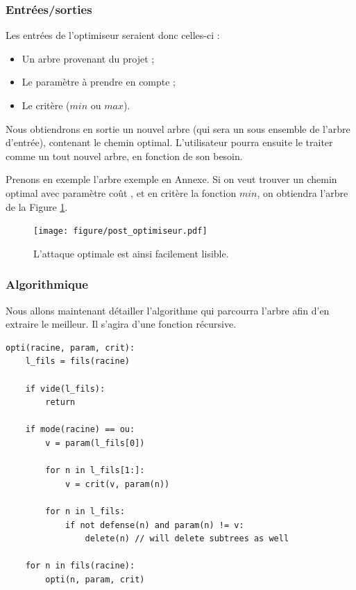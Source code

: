 		\subsubsection{Entrées/sorties}
			Les entrées de l'optimiseur seraient donc celles-ci :
			\begin{itemize}
				\item Un arbre provenant du projet ;
				\item Le paramètre à prendre en compte ;
				\item Le critère ($min$ ou $max$).\newline
			\end{itemize}
			
			Nous obtiendrons en sortie un nouvel arbre (qui sera un sous ensemble de l'arbre d'entrée), contenant le chemin optimal. 
			L'utilisateur pourra ensuite le traiter comme un tout nouvel arbre, en fonction de son besoin.

			Prenons en exemple l'arbre exemple en Annexe. %
			Si on veut trouver un chemin optimal avec paramètre \og coût \fg, et en critère la fonction $min$, on obtiendra l'arbre de la Figure \ref{fig:arbre_post_opti}.

		\begin{figure}[h!]
			\centering
			\texttt{[image: figure/post\_optimiseur.pdf]}
			\caption{L'attaque optimale est ainsi facilement lisible.}
			\label{fig:arbre_post_opti}
		\end{figure}
		
		\subsubsection{Algorithmique}
			Nous allons maintenant détailler l'algorithme qui parcourra l'arbre afin d'en extraire le meilleur. %
			Il s'agira d'une fonction récursive.

		\begin{lstlisting}
opti(racine, param, crit):
	l_fils = fils(racine)

	if vide(l_fils):
		return

	if mode(racine) == ou:
		v = param(l_fils[0])

		for n in l_fils[1:]:
			v = crit(v, param(n))

		for n in l_fils:
			if not defense(n) and param(n) != v:
				delete(n) // will delete subtrees as well
	
	for n in fils(racine):
		opti(n, param, crit)
		\end{lstlisting}

